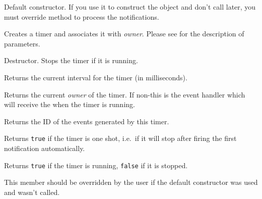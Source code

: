 Default constructor. If you use it to construct the object and don't call 
 later, you must override 
 method to process the notifications.


Creates a timer and associates it with {\it owner}. Please see 
 for the description of parameters.

\label{wxtimerdtor}


Destructor. Stops the timer if it is running.

\label{wxtimergetinterval}


Returns the current interval for the timer (in milliseconds).

\label{wxtimergetowner}


Returns the current {\it owner} of the timer.
If non-\NULL this is the event handler which will receive the 
 when the timer is running.

\label{wxtimergetid}


Returns the ID of the events generated by this timer.

\label{wxtimerisoneshot}


Returns {\tt true} if the timer is one shot, i.e.\ if it will stop after firing the
first notification automatically.

\label{wxtimerisrunning}


Returns {\tt true} if the timer is running, {\tt false} if it is stopped.

\label{wxtimernotify}


This member should be overridden by the user if the default constructor was
used and  wasn't called.

